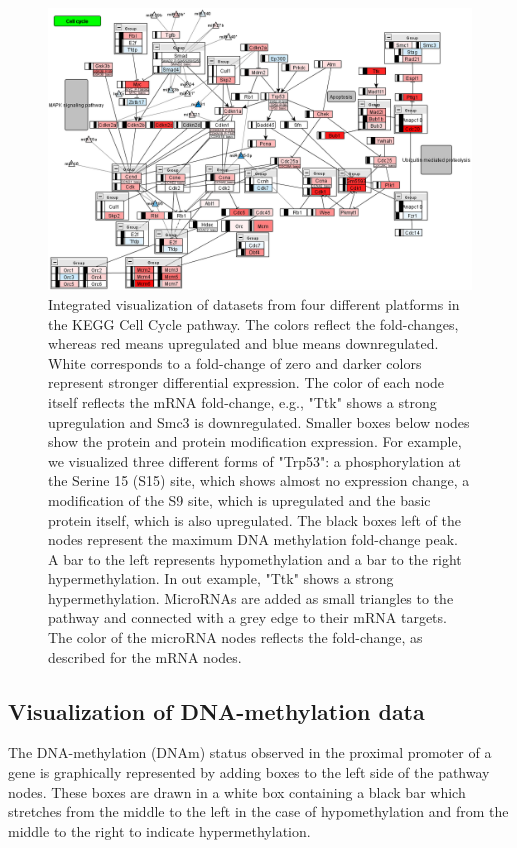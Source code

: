 \documentclass{bioinfo}
\begin{document}
\begin{figure}
\centering
\includegraphics[width=.65\textwidth]{figures/mmu04110.png}
\caption{
Integrated visualization of datasets from four different platforms in the KEGG Cell Cycle pathway.
The colors reflect the fold-changes, whereas red means upregulated and blue means downregulated. White corresponds to a fold-change of zero and darker colors represent stronger differential expression. The color of each node itself reflects the mRNA fold-change, e.g., "Ttk" shows a strong upregulation and Smc3 is downregulated. Smaller boxes below nodes show the protein and protein modification expression. For example, we visualized three different forms of "Trp53": a phosphorylation at the Serine 15 (S15) site, which shows almost no expression change, a modification of the S9 site, which is upregulated and the basic protein itself, which is also upregulated.
The black boxes left of the nodes represent the maximum DNA methylation fold-change peak. A bar to the left represents hypomethylation and a bar to the right hypermethylation. In out example, "Ttk" shows a strong hypermethylation. MicroRNAs are added as small triangles to the pathway and connected with a grey edge to their mRNA targets. The color of the microRNA nodes reflects the fold-change, as described for the mRNA nodes.}\label{fig:cellcycle}
\end{figure}


\subsection{Visualization of DNA-methylation data}

The DNA-methylation (DNAm) status observed in the proximal promoter of a gene is graphically
represented by adding boxes to the left side of the pathway nodes. These boxes are drawn in a white
box containing a black bar which stretches from the middle to the left in the case of
hypomethylation and from the middle to the right to indicate hypermethylation.
\end{document}
